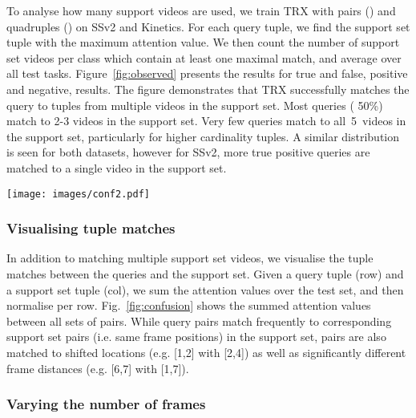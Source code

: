 \documentclass[final]{cvpr}
\begin{document}
To analyse how many support videos are used, we train TRX with pairs () and quadruples () on SSv2 and Kinetics.  
{For each query tuple, we find the support set tuple with the maximum attention value.  We then count the number of support set videos per class which contain at least one maximal match, and average over all test tasks.}
Figure~\ref{fig:observed} presents the results for true and false, positive and negative, results.
The figure demonstrates that TRX successfully matches the query to tuples from multiple videos in the support set.
Most queries ( 50\%) match to 2-3 videos in the support set.
Very few queries match to all~5~videos in the support set, particularly for higher cardinality tuples.
A similar distribution is seen for both datasets, however for SSv2, more true positive queries are matched to a single video in the support set.



\begin{SCfigure}[0.9]
    \texttt{[image: images/conf2.pdf]}
  \caption{Summed attention over the SSv2 test set, showing how query pairs (rows) match to support pairs (columns) from the TRX .  Numbers in red show the distance between the frames in the pair. \label{fig:confusion}
}
\end{SCfigure}


\vspace*{-2pt}
\subsubsection{Visualising tuple matches}\label{sec:ablation_look_pairs}
\vspace*{-5pt}

In addition to matching multiple support set videos, we visualise the tuple matches between the queries and the support set. 
Given a query tuple (row) and a support set tuple (col), we sum the attention values over the test set, and then normalise per row.
Fig.~\ref{fig:confusion} shows the summed attention values between all sets of pairs. 
While query pairs match frequently to corresponding support set pairs (i.e. same frame positions) in the support set, pairs are also matched to shifted locations (e.g. [1,2] with [2,4]) as well as significantly different frame distances (e.g. [6,7] with [1,7]). 

\vspace*{-10pt}

 \subsubsection{Varying the number of frames}\label{sec:ablation_runtime}
 
\end{document}
